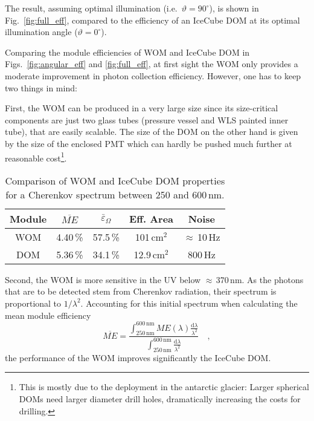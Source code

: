 The result, assuming optimal illumination (i.e.\ $\vartheta=90^\circ$), is shown 
in Fig.~\ref{fig:full_eff}, compared to the efficiency of an IceCube DOM at its 
optimal illumination angle ($\vartheta=0^\circ$).

Comparing the module efficiencies of WOM and IceCube DOM in 
Figs.~\ref{fig:angular_eff} and \ref{fig:full_eff}, at first sight the WOM only 
provides a moderate improvement in photon collection efficiency. However, one 
has to keep two things in mind:

First, the WOM can be produced in a very large size since its size-critical 
components are just two glass tubes (pressure vessel and WLS painted inner 
tube), that are easily scalable. The size of the DOM on the other hand is given 
by the size of the enclosed PMT which can hardly be pushed much further at 
reasonable cost\footnote{This is mostly due to the deployment in the antarctic 
glacier: Larger spherical DOMs need larger diameter drill holes, dramatically 
increasing the costs for drilling.}.

\begin{table}[tbh]
\begin{center}
\begin{tabular}{ccccc}
\toprule
Module & $\overline{ME}$ & $\bar\varepsilon_\Omega$ & Eff. Area     & Noise      
       \\ 
\midrule
WOM    & 4.40\,\%        & 57.5\,\%                 & 101\,cm$^2$   & 
$\approx$\,10\,Hz \\ 
DOM    & 5.36\,\%        & 34.1\,\%                 & 12.9\,cm$^2$  & 800\,Hz    
       \\
\bottomrule
\end{tabular}
\caption{Comparison of WOM and IceCube DOM properties for a Cherenkov spectrum 
between 250 and 600\,nm.}
\label{tab:comparison}
\end{center}
\end{table}

Second, the WOM is more sensitive in the UV below $\approx$\,370\,nm. As the 
photons that are to be detected stem from Cherenkov radiation, their spectrum is 
proportional to $1/\lambda^2$. Accounting for this initial spectrum when
calculating the mean module efficiency
\begin{equation}
 \overline{ME} = %
\frac{ \int_{250\,\mathrm{nm}}^{600\,\mathrm{nm}} ME(\lambda) 
\frac{\mathrm{d}\lambda}{\lambda^2}}
{\int_{250\,\mathrm{nm}}^{600\,\mathrm{nm}} \frac{\mathrm{d}\lambda}{\lambda^2} 
}\quad,
\end{equation}
the performance of the WOM improves significantly \wrt the IceCube DOM.

